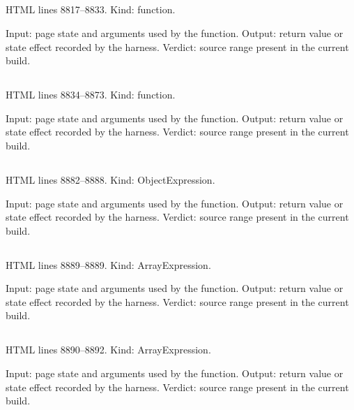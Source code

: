\subsection*{\texttt{}}
\label{vf_475_renderDiagnostics}
HTML lines 8817--8833. Kind: function.

Input: page state and arguments used by the function.
Output: return value or state effect recorded by the harness.
Verdict: source range present in the current build.

\subsection*{\texttt{}}
\label{vf_476_renderExports}
HTML lines 8834--8873. Kind: function.

Input: page state and arguments used by the function.
Output: return value or state effect recorded by the harness.
Verdict: source range present in the current build.

\subsection*{\texttt{}}
\label{vf_477_REVIEW_COLOURS}
HTML lines 8882--8888. Kind: ObjectExpression.

Input: page state and arguments used by the function.
Output: return value or state effect recorded by the harness.
Verdict: source range present in the current build.

\subsection*{\texttt{}}
\label{vf_478_PLATE_PASTELS}
HTML lines 8889--8889. Kind: ArrayExpression.

Input: page state and arguments used by the function.
Output: return value or state effect recorded by the harness.
Verdict: source range present in the current build.

\subsection*{\texttt{}}
\label{vf_479_CONTROL_CATEGORY_OPTIONS}
HTML lines 8890--8892. Kind: ArrayExpression.

Input: page state and arguments used by the function.
Output: return value or state effect recorded by the harness.
Verdict: source range present in the current build.

